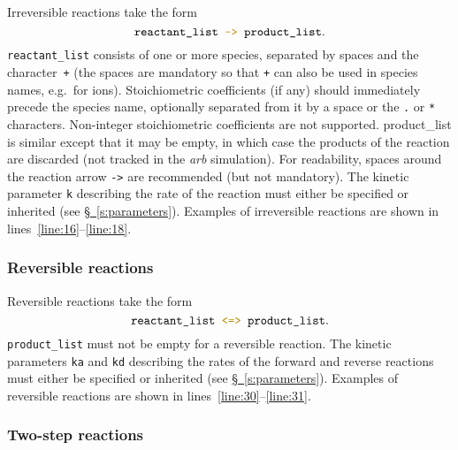 \documentclass[fontsize=12pt,
               captions=abovetable,
               numbers=noenddot,
              ]{scrartcl}
\newcommand{\eg}[1][\ ]{e.g.#1}
\newcommand{\sect}[1]{\hyperref[s:#1]{\S~\ref{s:#1}}}
\newcommand{\syntax}[2]{\textcolor{#1}{\texttt{#2}}}
\newcommand{\lnums}[2]{lines~\ref{line:#1}--\ref{line:#2}}
\begin{document}
Irreversible reactions take the form 
%
\begin{equation*}
\texttt{reactant\_list} \syntax{statement}{ -> } \texttt{product\_list}.
\end{equation*}
%
\texttt{reactant\_list} consists of one or more species, separated by spaces and the character~\syntax{statement}{+} (the spaces are mandatory so that \texttt{+} can also be used in species names, \eg for ions). Stoichiometric coefficients (if any) should immediately precede the species name, optionally separated from it by a space or the \syntax{statement}{.} or \syntax{statement}{*} characters. Non-integer stoichiometric coefficients are not supported. product\_list is similar except that it may be empty, in which case the products of the reaction are discarded (not tracked in the \emph{arb} simulation). For readability, spaces around the reaction arrow \syntax{statement}{->} are recommended (but not mandatory). The kinetic parameter \syntax{function}{k} describing the rate of the reaction must either be specified or inherited (see \sect{parameters}). Examples of irreversible reactions are shown in \lnums{16}{18}.

\subsubsection{Reversible reactions}

Reversible reactions take the form
%
\begin{equation*}
\texttt{reactant\_list} \syntax{statement}{ <=> } \texttt{product\_list}.
\end{equation*}
%
\texttt{product\_list} must not be empty for a reversible reaction. The kinetic parameters \syntax{function}{ka} and \syntax{function}{kd} describing the rates of the forward and reverse reactions must either be specified or inherited (see \sect{parameters}). Examples of reversible reactions are shown in \lnums{30}{31}.

\subsubsection{Two-step reactions}
\end{document}

